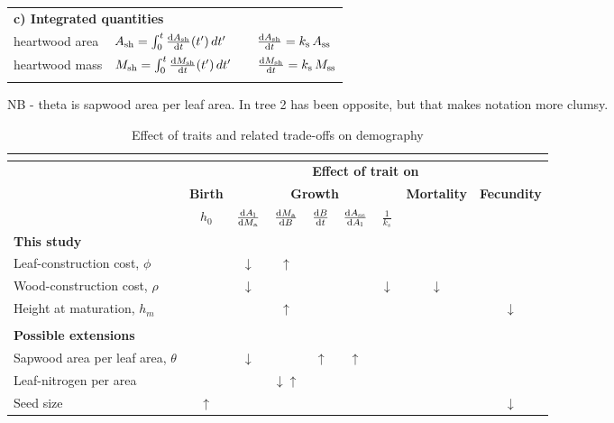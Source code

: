 \documentclass[a4paper,11pt]{article}
\begin{document}
\begin{table}[ht]
{\begin{doublespace}
\begin{tabular}{p{2.5cm}p{3.5cm}p{5cm}p{4cm} }
  \multicolumn{4}{l}{\textbf{c) Integrated quantities}} \\
  heartwood area &
    $A_{\rm sh} = \int_0^t \frac{{\rm d}A_{\rm sh}}{{\rm d}t}(t^\prime) \, dt^\prime$ &
     &
    $\frac{{\rm d}A_{\rm sh}}{{\rm d}t} = k_\textrm{s} \, A_\textrm{ss}$ \\
  heartwood mass &
    $M_{\rm sh} = \int_0^t \frac{{\rm d}M_{\rm sh}}{{\rm d}t}(t^\prime) \, dt^\prime$ &
     &
    $\frac{{\rm d}M_{\rm sh}}{{\rm d}t} = k_\textrm{s} \, M_\textrm{ss}$ \\
  \hline \\
\end{tabular}
NB -  theta is sapwood area per leaf area. In tree 2 has been opposite, but that makes notation more clumsy.
\end{doublespace}}
\label{tab:allometry}
\end{table}

\newpage

\begin{table}[ht]
\caption{Effect of traits and related trade-offs on demography}
\centering
{\footnotesize  %
  \begin{doublespace}
  \begin{tabular}[c]{l|c|ccccc|c|c}
  \multicolumn{9}{c}{}\\ \hline
  & \multicolumn{8}{c}{\textbf{Effect of trait on}}\\
  & \textbf{Birth} & \multicolumn{5}{c|}{\textbf{Growth}} & \textbf{Mortality} & \textbf{Fecundity} \\
  & $h_0$
  & $\frac{{\rm d}A_{\rm l}}{{\rm d}M_{\rm a}}$
  & $\frac{{\rm d}M_{\rm a}}{{\rm d}B}$
  & $\frac{{\rm d}B}{{\rm d}t}$
  & $\frac{{\rm d}A_\textrm{ss}}{{\rm d}A_{\rm l}}$
  & $\frac{1}{k_s}$ & &  \\\hline
  \textbf{This study}&&&&&&&&\\
  Leaf-construction cost, $\phi$ & & $\downarrow$ & $\uparrow$ & & & & \\
  Wood-construction cost, $\rho$ & & $\downarrow$ &  & & & $\downarrow$ & $\downarrow$  \\
  Height at maturation, $h_m$ & & &$\uparrow$ & & & & & $\downarrow$  \\
  &&&&&&&&\\\hline
  \textbf{Possible extensions}&&&&&&&&\\
  Sapwood area per leaf area, $\theta$ & & $\downarrow$& & $\uparrow$ & $\uparrow$ & & \\
  Leaf-nitrogen per area & & &$\downarrow$$\uparrow$ & & & & & \\
  Seed size & $\uparrow$ & & & & & & & $\downarrow$ \\ \hline
  \end{tabular}
  \end{doublespace}
}
\label{tab:trade-offs}
\end{table}
\end{document}

